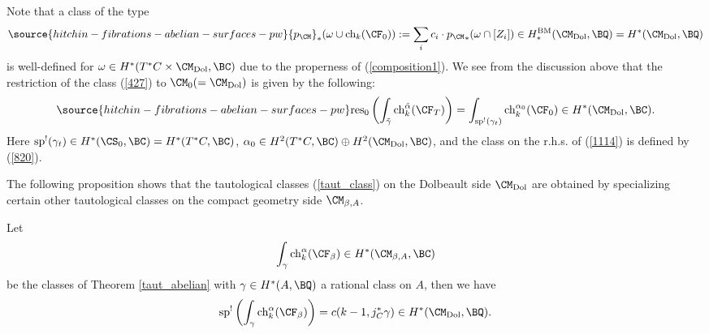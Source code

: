  Note that a class of the type
\begin{equation}\label{820}
\source{hitchin-fibrations-abelian-surfaces-pw}
{p_\CM}_*(\omega \cup \mathrm{ch}_k(\CF_0)): = \sum_i c_i\cdot {p_{\CM}}_*(\omega \cap [Z_i]) \in H^{\mathrm{BM}}_*(\CM_{\mathrm{Dol}}, \BQ) = H^*(\CM_{\mathrm{Dol}}, \BQ)
\end{equation}
is well-defined for $\omega \in H^*(T^*C \times \CM_{\mathrm{Dol}}, \BC)$ due to the properness of (\ref{composition1}). We see from the discussion above that the restriction of the class (\ref{427}) to $\CM_0 (= \CM_{\mathrm{Dol}})$ is given by the following:
\begin{equation}\label{1114}
\source{hitchin-fibrations-abelian-surfaces-pw}
\mathrm{res}_0\left( \int_{\tilde{\gamma}} \mathrm{ch}_k^{\tilde{\alpha}} (\CF_T) \right) = \int_{\mathrm{sp}^!(\gamma_t)} \mathrm{ch}_k^{\alpha_0}(\CF_0) \in H^*(\CM_{\mathrm{Dol}}, \BC).
\end{equation}
Here $\mathrm{sp}^!(\gamma_t) \in H^*(\CS_0, \BC) = H^*(T^*C, \BC)$, $\alpha_0 \in H^2(T^*C, \BC)\oplus H^2(\CM_{\mathrm{Dol}}, \BC)$, and the class on the r.h.s. of (\ref{1114}) is defined by (\ref{820}).


The following proposition shows that the tautological classes (\ref{taut_class}) on the Dolbeault side $\CM_{\mathrm{Dol}}$  are obtained by specializing certain other tautological classes on the compact geometry side $\CM_{\beta,A}$.

\begin{prop}
\notready\label{prop4.8}
Let
\[
\int_{\gamma} \mathrm{ch}_k^\alpha (\CF_\beta) \in H^*(\CM_{\beta,A}, \BC)
\]
be the classes of Theorem \ref{taut_abelian} with $\gamma \in H^*(A, \BQ)$ a rational class on $A$, then we have
\[
\mathrm{sp}^!\left( \int_{\gamma} \mathrm{ch}_k^\alpha (\CF_\beta) \right) = c(k-1, j_C^*\gamma) \in H^*(\CM_{\mathrm{Dol}}, \BQ).
\]
\end{prop}

